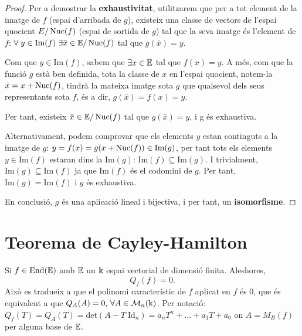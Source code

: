 \begin{proof}
Per a demostrar la \textbf{exhaustivitat}, utilitzarem que per a tot element de la imatge de $f$ (espai d'arribada de $g$), existeix una classe de vectors de l'espai quocient $E/\operatorname{Nuc}(f)$ (espai de sortida de $g$) tal que la seva imatge és l'element de $f$: $\forall \; y \in \text{Im}(f) \; \exists \bar{x} \in \mathbb{E}/\operatorname{Nuc}(f)$ tal que $g(\bar{x}) = y$.

Com que $y \in \text{Im}(f)$, sabem que $\exists x \in \mathbb{E}$ tal que $f(x) = y$. A més, com que la funció $g$ està ben definida, tota la classe de $x$ en l'espai quocient, notem-la $\bar{x} = x + \operatorname{Nuc}(f)$, tindrà la mateixa imatge sota $g$ que qualsevol dels seus representants sota $f$, és a dir, $g(\bar{x}) = f(x) = y$.

Per tant, existeix $\bar{x} \in \mathbb{E}/\operatorname{Nuc}(f)$ tal que $g(\bar{x}) = y$, i g és exhaustiva.

Alternativament, podem comprovar que els elements $y$ estan continguts a la imatge de $g$: $y = f(x) = g(x + \operatorname{Nuc}(f)) \in \text{Im}(g)$, per tant tots els elements $y \in \text{Im}(f)$ estaran dins la $\text{Im}(g)$: $\text{Im}(f) \subseteq \text{Im}(g)$. I trivialment, $\text{Im}(g) \subseteq \text{Im}(f)$ ja que $\text{Im}(f)$ és el codomini de $g$. Per tant, $\text{Im}(g) = \text{Im}(f)$ i $g$ és exhaustiva.

En conclusió, $g$ és una aplicació lineal i bijectiva, i per tant, un \textbf{isomorfisme}.
\end{proof}

\section{Teorema de Cayley-Hamilton}
Si $f \in \text{End}(\mathbb{E})$ amb $\mathbb{E}$ un $\Bbbk$ espai vectorial de dimensió finita. Aleshores, 
\[
Q_f(f) = 0.
\]
Això es tradueix a que el polinomi característic de $f$ aplicat en $f$ és 0, que és equivalent a que $Q_A(A) = 0,\, \forall A \in \mathcal{M}_n(\Bbbk)$. Per notació: $Q_f(T) = Q_A(T) = \text{det}(A - T\;\text{Id}_n) = a_nT^n +...+a_1T + a_0$ on $A = M_B(f)$ per alguna base de $\mathbb{E}$.
\\

